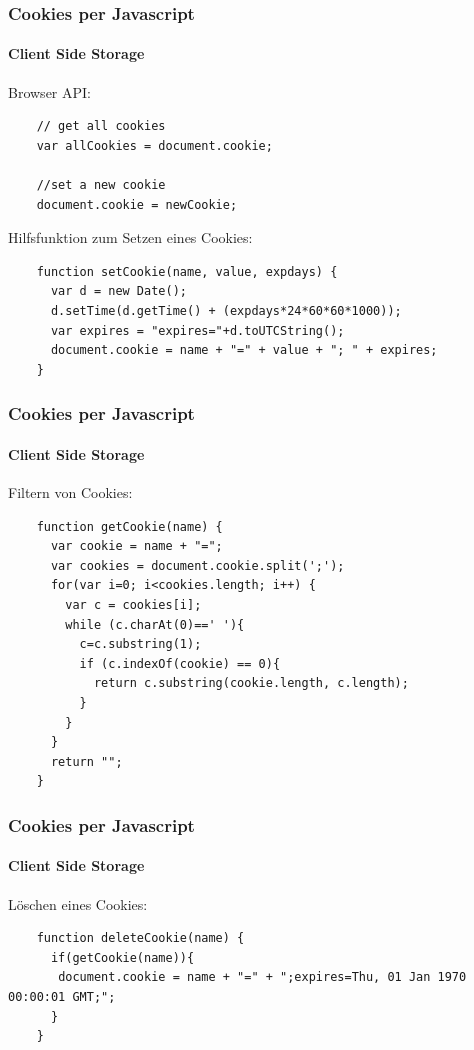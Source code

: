 
\begin{frame}[fragile]
\frametitle{Cookies per Javascript}
\framesubtitle{Client Side Storage}

	Browser API:
	
	\begin{lstlisting}
	// get all cookies
	var allCookies = document.cookie;
		
	//set a new cookie
	document.cookie = newCookie;	
	\end{lstlisting}
	
	Hilfsfunktion zum Setzen eines Cookies:
	\begin{lstlisting}
	function setCookie(name, value, expdays) {
	  var d = new Date();
	  d.setTime(d.getTime() + (expdays*24*60*60*1000));
	  var expires = "expires="+d.toUTCString();
	  document.cookie = name + "=" + value + "; " + expires;
	}
	\end{lstlisting}
	
\end{frame}

\begin{frame}[fragile]
\frametitle{Cookies per Javascript}
\framesubtitle{Client Side Storage}

	Filtern von Cookies:
			
	\begin{lstlisting}
	function getCookie(name) {
	  var cookie = name + "=";
	  var cookies = document.cookie.split(';');
	  for(var i=0; i<cookies.length; i++) {
	    var c = cookies[i];
	    while (c.charAt(0)==' '){
	      c=c.substring(1);
	      if (c.indexOf(cookie) == 0){
	        return c.substring(cookie.length, c.length);
	      }	
	    }
	  }
	  return "";
	}
	\end{lstlisting}
\end{frame}

\begin{frame}[fragile]
\frametitle{Cookies per Javascript}
\framesubtitle{Client Side Storage}

	Löschen eines Cookies:
			
	\begin{lstlisting}
	function deleteCookie(name) {
	  if(getCookie(name)){
	   document.cookie = name + "=" + ";expires=Thu, 01 Jan 1970 00:00:01 GMT;";
	  }
	}
	\end{lstlisting}
\end{frame}

